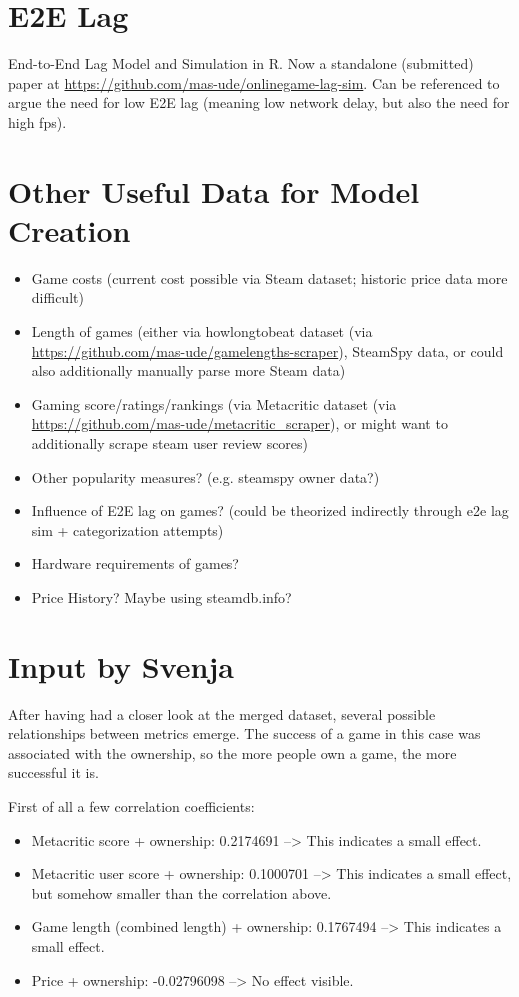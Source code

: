 \section{E2E Lag}
End-to-End Lag Model and Simulation in R. Now a standalone (submitted) paper at \url{https://github.com/mas-ude/onlinegame-lag-sim}. Can be referenced to argue the need for low E2E lag (meaning low network delay, but also the need for high fps).


\section{Other Useful Data for Model Creation}

\begin{itemize}
	\item Game costs (current cost possible via Steam dataset; historic price data more difficult)
	\item Length of games (either via howlongtobeat dataset (via \url{https://github.com/mas-ude/gamelengths-scraper}), SteamSpy data, or could also additionally manually parse more Steam data)
	\item Gaming score/ratings/rankings (via Metacritic dataset (via \url{https://github.com/mas-ude/metacritic_scraper}), or might want to additionally scrape steam user review scores)
	\item Other popularity measures? (e.g. steamspy owner data?)
	\item Influence of E2E lag on games? (could be theorized indirectly through e2e lag sim + categorization attempts)
	\item Hardware requirements of games?

	\item Price History? Maybe using steamdb.info?
\end{itemize}

\section{Input by Svenja}

After having had a closer look at the merged dataset, several possible relationships between metrics emerge. The success of a game in this case was associated with the ownership, so the more people own a game, the more successful it is.

First of all a few correlation coefficients:
\begin{itemize}
	\item Metacritic score + ownership: 0.2174691 --> This indicates a small effect.
	\item Metacritic user score + ownership: 0.1000701 --> This indicates a small effect, but somehow smaller than the correlation above.
	\item Game length (combined length) + ownership: 0.1767494 --> This indicates a small effect. 
	\item Price + ownership: -0.02796098 --> No effect visible.
\end{itemize}

